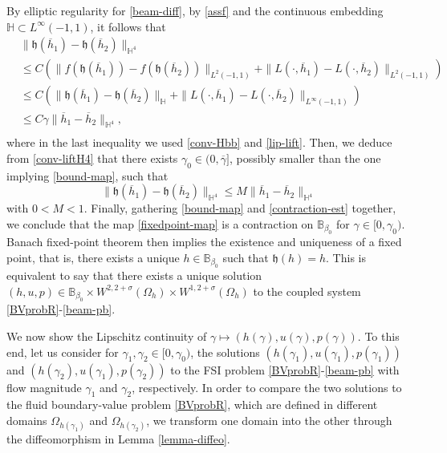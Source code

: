 \documentclass[11pt,a4paper]{amsart}
\theoremstyle{remark}
\theoremstyle{definition}
\numberwithin{equation}{section}
\numberwithin{proposition}{section}
\begin{document}
By elliptic regularity for \eqref{beam-diff}, by \eqref{assf} and the continuous embedding $\mathbb{H}\subset L^\infty(-1,1)$, it follows that
\begin{equation}\label{conv-liftH4}\begin{aligned}
        &\|\mathfrak{h}(\overline{h}_1)- \mathfrak{h}(\overline{h}_2)\|_{\mathbb{H}^4} \\[5pt]&\leq C\left( \|f(\mathfrak{h}(\overline{h}_1)) - f(\mathfrak{h}(\overline{h}_2))\|_{L^2(-1,1)} + \|L(\cdot, \overline{h}_1)- L(\cdot, \overline{h}_2)\|_{L^2(-1,1)}\right)\\[5pt]
        &\leq C\left(  \|\mathfrak{h}(\overline{h}_1)-\mathfrak{h}(\overline{h}_2) \|_{\mathbb{H}} + \|L(\cdot, \overline{h}_1)- L(\cdot, \overline{h}_2)\|_{L^\infty(-1,1)} \right)\\[5pt]&\leq C\gamma\|\overline{h}_1- \overline{h}_2\|_{\mathbb{H}^4},\\[5pt]
        \end{aligned}
\end{equation}where in the last inequality we used \eqref{conv-Hbb} and \eqref{lip-lift}. Then, we deduce from \eqref{conv-liftH4} that there exists  $\gamma_0\in (0, \overline{\gamma}]$, possibly smaller than the one implying \eqref{bound-map}, such that
\begin{equation}\label{contraction-est}
    \|\mathfrak{h}(\overline{h}_1)- \mathfrak{h}(\overline{h}_2)\|_{\mathbb{H}^4}\leq M \|\overline{h}_1- \overline{h}_2\|_{\mathbb{H}^4}
\end{equation} with $0<M<1$. Finally, gathering \eqref{bound-map} and \eqref{contraction-est} together, we conclude that
the map \eqref{fixedpoint-map} is a contraction on $\mathbb{B}_{\beta_0}$ for $\gamma\in [0, \gamma_0)$.  Banach fixed-point theorem then implies the existence and uniqueness of a  fixed point, that is, there exists a unique $h\in \mathbb{B}_{\beta_0}$  such that $\mathfrak{h}(h)=h$. This is equivalent to say that there exists a unique solution $(h, u, p)\in \mathbb{B}_{\beta_0}\times W^{2, 2+\sigma}(\Omega_h)\times W^{1, 2+\sigma}(\Omega_h)$ to the coupled system \eqref{BVprobR}-\eqref{beam-pb}.\par
We now show the Lipschitz continuity of $\gamma\mapsto (h(\gamma), u(\gamma), p(\gamma))$. To this end, let us consider for $\gamma_1, \gamma_2 \in [0, \gamma_0)$, the solutions $(h(\gamma_1), u(\gamma_1), p(\gamma_1))$ and $(h(\gamma_2), u(\gamma_1), p(\gamma_2))$ to the FSI problem  \eqref{BVprobR}-\eqref{beam-pb} with flow magnitude $\gamma_1$ and $\gamma_2$, respectively. In order to compare the two solutions to the fluid boundary-value problem \eqref{BVprobR}, which are defined in different domains $\Omega_{h(\gamma_1)}$ and $\Omega_{h(\gamma_2)}$, we transform one domain into the other through the diffeomorphism  in Lemma \ref{lemma-diffeo}.
\end{document}
